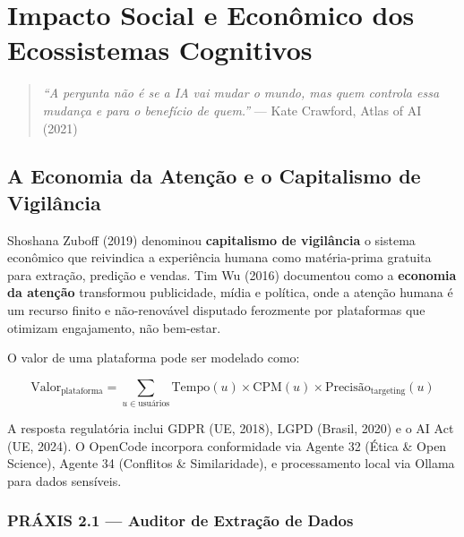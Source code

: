 \chapter{Impacto Social e Econômico dos Ecossistemas Cognitivos}

\begin{quote}
\textit{``A pergunta não é se a IA vai mudar o mundo, mas quem controla essa mudança e para o benefício de quem.''} --- Kate Crawford, Atlas of AI (2021)
\end{quote}

\section{A Economia da Atenção e o Capitalismo de Vigilância}

Shoshana Zuboff (2019) \cite{zuboff2019age} denominou \textbf{capitalismo de vigilância} o sistema econômico que reivindica a experiência humana como matéria-prima gratuita para extração, predição e vendas. Tim Wu (2016) \cite{wu2016attention} documentou como a \textbf{economia da atenção} transformou publicidade, mídia e política, onde a atenção humana é um recurso finito e não-renovável disputado ferozmente por plataformas que otimizam engajamento, não bem-estar.

O valor de uma plataforma pode ser modelado como:

\begin{equation}
\text{Valor}_{\text{plataforma}} = \sum_{u \in \text{usuários}} \text{Tempo}(u) \times \text{CPM}(u) \times \text{Precisão}_{\text{targeting}}(u)
\label{eq:platform_value}
\end{equation}

A resposta regulatória inclui GDPR (UE, 2018), LGPD (Brasil, 2020) e o AI Act (UE, 2024). O OpenCode incorpora conformidade via Agente 32 (Ética \& Open Science), Agente 34 (Conflitos \& Similaridade), e processamento local via Ollama para dados sensíveis.

\subsection{PRÁXIS 2.1 — Auditor de Extração de Dados}


